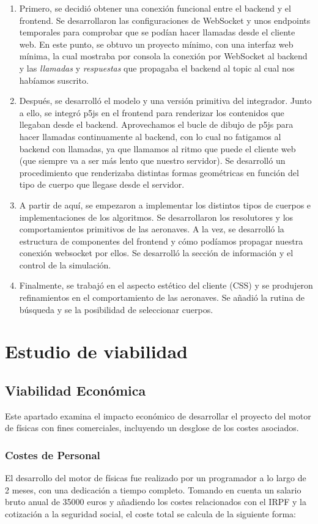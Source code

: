 \begin{enumerate}
    \item Primero, se decidió obtener una conexión funcional entre el backend y el frontend. Se desarrollaron las configuraciones de WebSocket y unos endpoints temporales para comprobar que se podían hacer llamadas desde el cliente web.
    En este punto, se obtuvo un proyecto mínimo, con una interfaz web mínima, la cual mostraba por consola la conexión por WebSocket al backend y las \textit{llamadas} y \textit{respuestas} que propagaba el backend al topic al cual nos habíamos suscrito.
    \item Después, se desarrolló el modelo y una versión primitiva del integrador. Junto a ello, se integró p5js en el frontend para renderizar los contenidos que llegaban desde el backend. Aprovechamos el bucle de dibujo de p5js para hacer llamadas continuamente al backend, con lo cual no fatigamos al backend con llamadas, ya que llamamos al ritmo que puede el cliente web (que siempre va a ser más lento que nuestro servidor). Se desarrolló un procedimiento que renderizaba distintas formas geométricas en función del tipo de cuerpo que llegase desde el servidor. 
    \item A partir de aquí, se empezaron a implementar los distintos tipos de cuerpos e implementaciones de los algoritmos. Se desarrollaron los resolutores y los comportamientos primitivos de las aeronaves. A la vez, se desarrolló la estructura de componentes del frontend y cómo podíamos propagar nuestra conexión websocket por ellos. Se desarrolló la sección de información y el control de la simulación.
    \item Finalmente, se trabajó en el aspecto estético del cliente (CSS) y se produjeron refinamientos en el comportamiento de las aeronaves. Se añadió la rutina de búsqueda y se la posibilidad de seleccionar cuerpos.
\end{enumerate}
\section{Estudio de viabilidad}
\subsection{Viabilidad Económica}
Este apartado examina el impacto económico de desarrollar el proyecto del motor de físicas con fines comerciales, incluyendo un desglose de los costes asociados.

\subsubsection{Costes de Personal}
El desarrollo del motor de físicas fue realizado por un programador a lo largo de 2 meses, con una dedicación a tiempo completo. Tomando en cuenta un salario bruto anual de 35000 euros y añadiendo los costes relacionados con el IRPF y la cotización a la seguridad social, el coste total se calcula de la siguiente forma:

